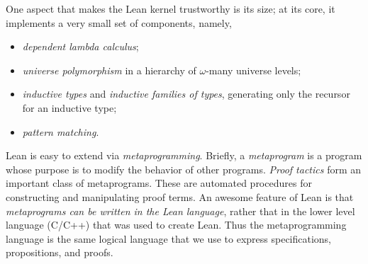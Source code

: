 \documentclass[12pt]{amsart}  %
\begin{document}
One aspect that makes the Lean kernel trustworthy is its size; at its core, it implements a very small set of components, namely,
\begin{itemize}
  \item \emph{dependent lambda calculus};
  \item \emph{universe polymorphism} in a hierarchy of $\omega$-many universe levels;
  \item \emph{inductive types} and \emph{inductive families of types}, generating only the recursor for an inductive type;
  \item \emph{pattern matching}.
\end{itemize}


Lean is easy to extend via \emph{metaprogramming}. Briefly, a \emph{metaprogram} is
a program whose purpose is to modify the behavior of other programs. \emph{Proof tactics} form an important class of metaprograms. These are automated procedures for constructing and manipulating proof terms. An awesome feature of Lean is that \emph{metaprograms can be written in the Lean language}, rather that in the lower level language (C/C++) that was used to create Lean. Thus the metaprogramming language is the same logical language that we use to express specifications, propositions, and proofs.
\end{document}
